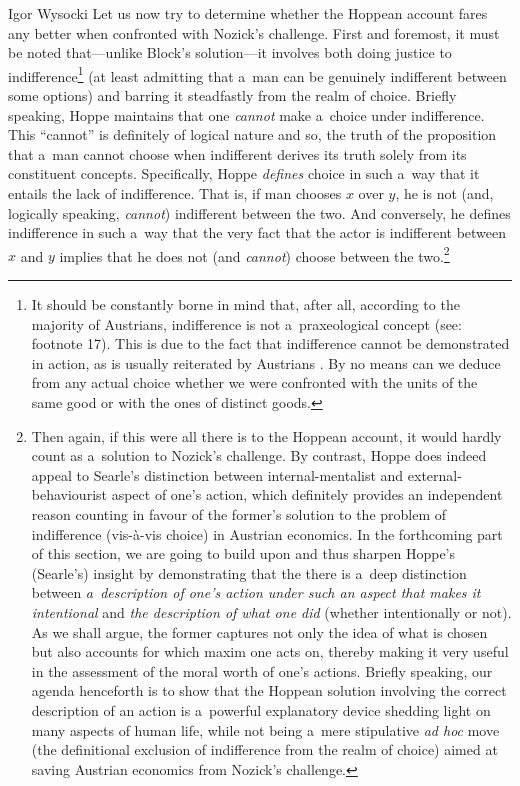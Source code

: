 \begin{artengenv}{Igor Wysocki}
Let us now try to determine whether the Hoppean
\parencite*[][]{hoppe_must_2005} %
 account fares any better when confronted with Nozick's challenge. First and foremost, it must be noted that---unlike Block's solution---it involves both doing justice to indifference\footnote{It should be constantly borne in mind that, after all, according to the majority of Austrians, indifference is not a~praxeological concept (see: footnote 17). This is due to the fact that indifference cannot be demonstrated in action, as is usually reiterated by Austrians 
\parencites[see][]{block_rejoinder_2009}[][]{block_rejoinder_2010}[][]{rothbard_toward_2011}. %
 By no means can we deduce from any actual choice whether we were confronted with the units of the same good or with the ones of distinct goods. } (at least admitting that a~man can be genuinely indifferent between some options) and barring it steadfastly from the realm of choice. Briefly speaking, Hoppe 
\parencite*[][]{hoppe_must_2005} %
 maintains that one \textit{cannot} make a~choice under indifference. This ``cannot'' is definitely of logical nature and so, the truth of the proposition that a~man cannot choose when indifferent derives its truth solely from its constituent concepts. Specifically, Hoppe \textit{defines} choice in such a~way that it entails the lack of indifference. That is, if man chooses $x$ over $y$, he is not (and, logically speaking, \textit{cannot}) indifferent between the two. And conversely, he defines indifference in such a~way that the very fact that the actor is indifferent between $x$ and $y$ implies that he does not (and \textit{cannot}) choose between the two.\footnote{Then again, if this were all there is to the Hoppean account, it would hardly count as a~solution to Nozick's challenge. By contrast, Hoppe does indeed appeal to Searle's 
\parencite*[][]{searle_minds_1984} %
 distinction between internal-mentalist and external-behaviourist aspect of one's action, which definitely provides an independent reason counting in favour of the former's solution to the problem of indifference (vis-à-vis choice) in Austrian economics. In the forthcoming part of this section, we are going to build upon and thus sharpen Hoppe's (Searle's) insight by demonstrating that the there is a~deep distinction between \textit{a~description of one's action under such an aspect that makes it intentional} and \textit{the description of what one did} (whether intentionally or not). As we shall argue, the former captures not only the idea of what is chosen but also accounts for which maxim one acts on, thereby making it very useful in the assessment of the moral worth of one's actions. Briefly speaking, our agenda henceforth is to show that the Hoppean solution involving the correct description of an action is a~powerful explanatory device shedding light on many aspects of human life, while not being a~mere stipulative \textit{ad hoc} move (the definitional exclusion of indifference from the realm of choice) aimed at saving Austrian economics from Nozick's challenge.}


\end{artengenv}
